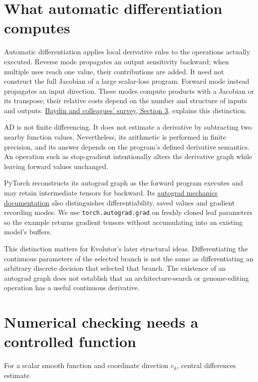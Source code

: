 \section{What automatic differentiation
computes}\label{what-automatic-differentiation-computes}

Automatic differentiation applies local derivative rules to the
operations actually executed. Reverse mode propagates an output
sensitivity backward; when multiple uses reach one value, their
contributions are added. It need not construct the full Jacobian of a
large scalar-loss program. Forward mode instead propagates an input
direction. These modes compute products with a Jacobian or its
transpose; their relative costs depend on the number and structure of
inputs and outputs.
\href{https://jmlr.org/papers/volume18/17-468/17-468.pdf}{Baydin and
colleagues' survey, Section 3}, explains this distinction.

AD is not finite differencing. It does not estimate a derivative by
subtracting two nearby function values. Nevertheless, its arithmetic is
performed in finite precision, and its answer depends on the program's
defined derivative semantics. An operation such as stop-gradient
intentionally alters the derivative graph while leaving forward values
unchanged.

PyTorch reconstructs its autograd graph as the forward program executes
and may retain intermediate tensors for backward. Its
\href{https://docs.pytorch.org/docs/2.10/notes/autograd.html}{autograd
mechanics documentation} also distinguishes differentiability, saved
values and gradient recording modes. We use \texttt{torch.autograd.grad}
on freshly cloned leaf parameters so the example returns gradient
tensors without accumulating into an existing model's buffers.

This distinction matters for Evolutor's later structural ideas.
Differentiating the continuous parameters of the selected branch is not
the same as differentiating an arbitrary discrete decision that selected
that branch. The existence of an autograd graph does not establish that
an architecture-search or genome-editing operation has a useful
continuous derivative.

\section{Numerical checking needs a controlled
function}\label{numerical-checking-needs-a-controlled-function}

For a scalar smooth function and coordinate direction \(e_k\), central
differences estimate

